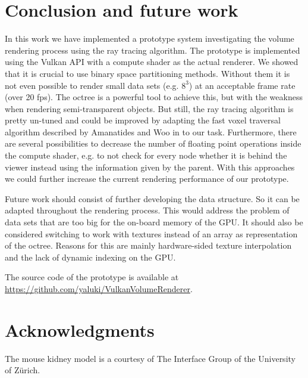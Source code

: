 \documentclass[12pt,conference]{IEEEtran}
\begin{document}
\section{Conclusion and future work}
\label{conclusion}
In this work we have implemented a prototype system investigating the volume rendering process using the ray tracing algorithm. The prototype is implemented using the Vulkan API with a compute shader as the actual renderer. We showed that it is crucial to use binary space partitioning methods. Without them it is not even possible to render small data sets (e.g. $8^3$) at an acceptable frame rate (over 20 fps). The octree is a powerful tool to achieve this, but with the weakness when rendering semi-transparent objects. But still, the ray tracing algorithm is pretty un-tuned and could be improved by adapting the fast voxel traversal algorithm described by Amanatides and Woo in \cite{amanatides1987fast} to our task. Furthermore, there are several possibilities to decrease the number of floating point operations inside the compute shader, e.g. to not check for every node whether it is behind the viewer instead using the information given by the parent. With this approaches we could further increase the current rendering performance of our prototype.
\par
Future work should consist of further developing the data structure. So it can be adapted throughout the rendering process. This would address the problem of data sets that are too big for the on-board memory of the GPU. It should also be considered switching to work with textures instead of an array as representation of the octree. Reasons for this are mainly hardware-sided texture interpolation and the lack of dynamic indexing on the GPU.
\par
The source code of the prototype is available at \url{https://github.com/yaluki/VulkanVolumeRenderer}.

\section{Acknowledgments}
The mouse kidney model is a courtesy of The Interface Group of the University of Zürich.



\end{document}
